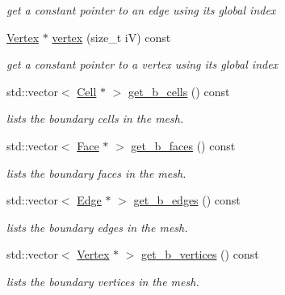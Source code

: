\begin{DoxyCompactItemize}
\begin{DoxyCompactList}\small\item\em get a constant pointer to an edge using its global index \end{DoxyCompactList}\item 
\mbox{\label{classHArDCore3D_1_1Mesh_ad099224c697c05a57fad6a47fdcd9e76}} 
\hyperlink{classHArDCore3D_1_1Vertex}{Vertex} $\ast$ \hyperlink{classHArDCore3D_1_1Mesh_ad099224c697c05a57fad6a47fdcd9e76}{vertex} (size\+\_\+t iV) const
\begin{DoxyCompactList}\small\item\em get a constant pointer to a vertex using its global index \end{DoxyCompactList}\item 
std\+::vector$<$ \hyperlink{classHArDCore3D_1_1Cell}{Cell} $\ast$ $>$ \hyperlink{group__Mesh_ga648b0420dce3db1204d4e1b270b57aa2}{get\+\_\+b\+\_\+cells} () const
\begin{DoxyCompactList}\small\item\em lists the boundary cells in the mesh. \end{DoxyCompactList}\item 
std\+::vector$<$ \hyperlink{classHArDCore3D_1_1Face}{Face} $\ast$ $>$ \hyperlink{group__Mesh_ga1cedb2faebdc7ec891e6d49b74e2d0b3}{get\+\_\+b\+\_\+faces} () const
\begin{DoxyCompactList}\small\item\em lists the boundary faces in the mesh. \end{DoxyCompactList}\item 
std\+::vector$<$ \hyperlink{classHArDCore3D_1_1Edge}{Edge} $\ast$ $>$ \hyperlink{group__Mesh_gaab118708826029e78cab33759480457d}{get\+\_\+b\+\_\+edges} () const
\begin{DoxyCompactList}\small\item\em lists the boundary edges in the mesh. \end{DoxyCompactList}\item 
std\+::vector$<$ \hyperlink{classHArDCore3D_1_1Vertex}{Vertex} $\ast$ $>$ \hyperlink{group__Mesh_ga41f26cc7aaf8946a13b3f2c1700c8e63}{get\+\_\+b\+\_\+vertices} () const
\begin{DoxyCompactList}\small\item\em lists the boundary vertices in the mesh. \end{DoxyCompactList}\item 
\mbox{\label{classHArDCore3D_1_1Mesh_a200361b60684c429e961e6b4f278dfb3}} 

\end{DoxyCompactItemize}
